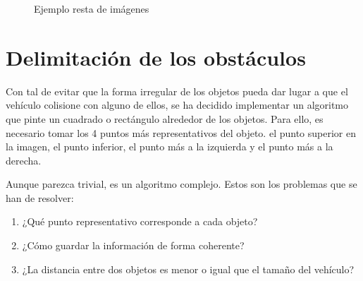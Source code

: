 \begin{figure}[bhpt]
 \centering
 \caption{Ejemplo resta de imágenes}
 \label{fig:DeteccionObjetosLAB}
\end{figure}

\section{Delimitación de los obstáculos}\label{sec:SquareObjetos}

Con tal de evitar que la forma irregular de los objetos pueda dar lugar a que el vehículo colisione con alguno de ellos, se ha decidido implementar un algoritmo que pinte un cuadrado o rectángulo alrededor de los objetos. Para ello, es necesario tomar los 4 puntos más representativos del objeto. el punto superior en la imagen, el punto inferior, el punto más a la izquierda y el punto más a la derecha.

Aunque parezca trivial, es un algoritmo complejo. Estos son los problemas que se han de resolver:

\begin{enumerate}
\item ¿Qué punto representativo corresponde a cada objeto?
\item ¿Cómo guardar la información de forma coherente?
\item ¿La distancia entre dos objetos es menor o igual que el tamaño del vehículo?
\end{enumerate} 

